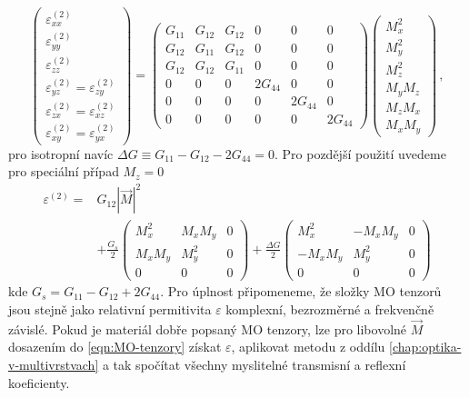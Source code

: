 \begin{equation}
    \begin{pmatrix}
        \varepsilon^{(2)}_{xx} \\ \varepsilon^{(2)}_{yy} \\ \varepsilon^{(2)}_{zz} 
        \\ \varepsilon^{(2)}_{yz}=\varepsilon^{(2)}_{zy} 
        \\ \varepsilon^{(2)}_{zx}=\varepsilon^{(2)}_{xz} 
        \\ \varepsilon^{(2)}_{xy}=\varepsilon^{(2)}_{yx}
    \end{pmatrix}
    =\begin{pmatrix}
        G_{11} & G_{12} & G_{12} & 0 & 0 & 0 \\
        G_{12} & G_{11} & G_{12} & 0 & 0 & 0 \\
        G_{12} & G_{12} & G_{11} & 0 & 0 & 0 \\
        0 & 0 & 0 & 2G_{44} & 0 & 0 \\
        0 & 0 & 0 & 0 & 2G_{44} & 0 \\
        0 & 0 & 0 & 0 & 0 & 2G_{44}
    \end{pmatrix}
    \begin{pmatrix} M_x^2 \\ M_y^2 \\ M_z^2 \\ M_y M_z \\ M_z M_x \\ M_x M_y \end{pmatrix} \,,
\end{equation}
pro isotropní navíc $\Delta G \equiv G_{11}-G_{12}-2G_{44}=0$.
Pro pozdější použití uvedeme pro speciální případ $M_z=0$
\begin{align}
    \varepsilon^{(2)} =& G_{12} |\vec{M}|^2 \\ 
    &+ \frac{G_s}{2} \begin{pmatrix}
        M_x^2 & M_x M_y & 0 \\ M_x M_y & M_y^2 & 0 \\ 0 & 0 & 0
    \end{pmatrix}
    + \frac{\Delta G}{2} \begin{pmatrix}
        M_x^2 & -M_xM_y & 0 \\ -M_xM_y & M_y^2 & 0 \\ 0 & 0 & 0
    \end{pmatrix}
\end{align}
kde $G_s=G_{11}-G_{12}+2G_{44}$.
Pro úplnost připomeneme, že složky MO tenzorů jsou stejně jako relativní permitivita $\varepsilon$ komplexní, bezrozměrné a frekvenčně závislé.
Pokud je materiál dobře popsaný MO tenzory, lze pro libovolné $\vec{M}$ dosazením do \eqref{eqn:MO-tenzory} získat $\varepsilon$, aplikovat metodu z oddílu \ref{chap:optika-v-multivrstvach} a tak spočítat všechny myslitelné transmisní a reflexní koeficienty.

